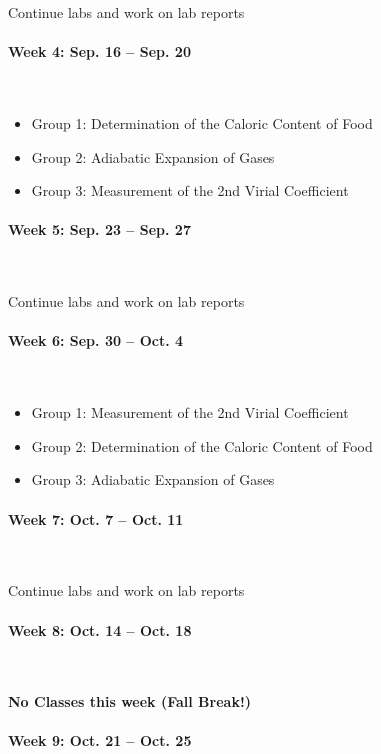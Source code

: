 \documentclass[12pt, letterpaper]{article}
\begin{document}
Continue labs and work on lab reports

\paragraph{Week 4: Sep. 16 -- Sep. 20}~

\begin{itemize}
  \item Group 1: Determination of the Caloric Content of Food
  \item Group 2: Adiabatic Expansion of Gases
  \item Group 3: Measurement of the 2nd Virial Coefficient
\end{itemize}

\paragraph{Week 5: Sep. 23 -- Sep. 27}~

Continue labs and work on lab reports

\paragraph{Week 6: Sep. 30 -- Oct. 4}~

\begin{itemize}
  \item Group 1: Measurement of the 2nd Virial Coefficient
  \item Group 2: Determination of the Caloric Content of Food
  \item Group 3: Adiabatic Expansion of Gases
\end{itemize}

\paragraph{Week 7: Oct. 7 -- Oct. 11}~

Continue labs and work on lab reports

\paragraph{Week 8: Oct. 14 -- Oct. 18}~

\textbf{No Classes this week (Fall Break!)}

\paragraph{Week 9: Oct. 21 -- Oct. 25}~
\end{document}
